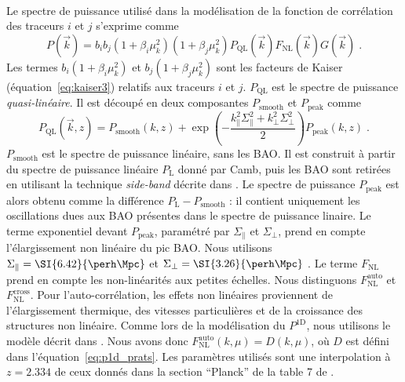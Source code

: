 \paragraph{}
Le spectre de puissance utilisé dans la modélisation de la fonction de corrélation des traceurs $i$ et $j$ s'exprime comme
\begin{equation}
  \label{eq:pk_model1}
  P(\vec k) = b_i b_j (1+\beta_i \mu_k^2)(1+\beta_j \mu_k^2) P_{\mathrm{QL}}(\vec k) F_{\mathrm{NL}}(\vec k) G(\vec k) \; .
\end{equation}
Les termes $b_i (1+\beta_i \mu_k^2)$ et $b_j (1+\beta_j \mu_k^2)$ sont les facteurs de Kaiser (équation~\ref{eq:kaiser3}) relatifs aux traceurs $i$ et $j$.
$P_{\mathrm{QL}}$ est le spectre de puissance \emph{quasi-linéaire}. Il est découpé en deux composantes $P_{\mathrm{smooth}}$ et $P_{\mathrm{peak}}$ comme
\begin{equation}
  \label{eq:pk_ql}
  P_{\mathrm{QL}}(\vec k, z) = P_{\mathrm{smooth}}(k, z) + \exp(- \frac{k_{\parallel}^2 \Sigma_{\parallel}^2 + k_{\perp}^2 \Sigma_{\perp}^2}{2}) P_{\mathrm{peak}}(k,z) \; .
\end{equation}
$P_{\mathrm{smooth}}$ est le spectre de puissance linéaire, sans les BAO. Il est construit à partir du spectre de puissance linéaire $P_{\mathrm{L}}$ donné par Camb, puis les BAO sont retirées en utilisant la technique \emph{side-band} décrite dans \textcite{Kirkby2013}.
Le spectre de puissance $P_{\mathrm{peak}}$ est alors obtenu comme la différence $P_{\mathrm{L}} - P_{\mathrm{smooth}}$ : il contient uniquement les oscillations dues aux BAO présentes dans le spectre de puissance linaire.
Le terme exponentiel devant $P_{\mathrm{peak}}$, paramétré par $\Sigma_{\parallel}$ et $\Sigma_{\perp}$, prend en compte l'élargissement non linéaire du pic BAO. Nous utilisons $\Sigma_{\parallel} = \SI{6.42}{\perh\Mpc}$ et $\Sigma_{\perp} = \SI{3.26}{\perh\Mpc}$  \autocite{eisenstein_robustness_2007}.
Le terme $F_{\mathrm{NL}}$ prend en compte les non-linéarités aux petites échelles. Nous distinguons $F_{\mathrm{NL}}^{\mathrm{auto}}$ et $F_{\mathrm{NL}}^{\mathrm{cross}}$. Pour l'auto-corrélation, les effets non linéaires proviennent de l'élargissement thermique, des vitesses particulières et de la croissance des structures non linéaire.
Comme lors de la modélisation du $P^{\mathrm{1D}}$, nous utilisons le modèle décrit dans \textcite{Arinyo-i-Prats2015}. Nous avons donc $F_{\mathrm{NL}}^{\mathrm{auto}}(k, \mu) = D(k, \mu)$, où $D$ est défini dans l'équation~\ref{eq:p1d_prats}. Les paramètres utilisés sont une interpolation à $z = \num{2.334}$ de ceux donnés dans la section ``Planck'' de la table 7 de \textcite{Arinyo-i-Prats2015}.
